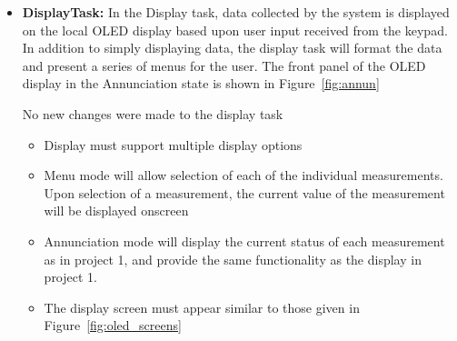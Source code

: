\documentclass[12pt]{article} %
\begin{document}
\begin{itemize}
	\item \textbf{DisplayTask: }
		In the Display task, data collected by the system is
		displayed on the local OLED display based upon user input received from
		the keypad. In addition to simply displaying data, the display task will
		format the data and present a series of menus for the user. The front
		panel of the OLED display in the Annunciation state is shown in
		Figure~\ref{fig:annun}

		No new changes were made to the display task
		\begin{itemize}
			\item Display must support multiple display options
			\item Menu mode will allow selection of each of the individual
				measurements. Upon selection of a measurement, the current value of the
				measurement will be displayed onscreen
			\item Annunciation mode will display the current status of each
				measurement as in project 1, and provide the same functionality as the
				display in project 1.
			\item The display screen must appear similar to those given in Figure~\ref{fig:oled_screens}

		\end{itemize}



\end{itemize}
\end{document}
